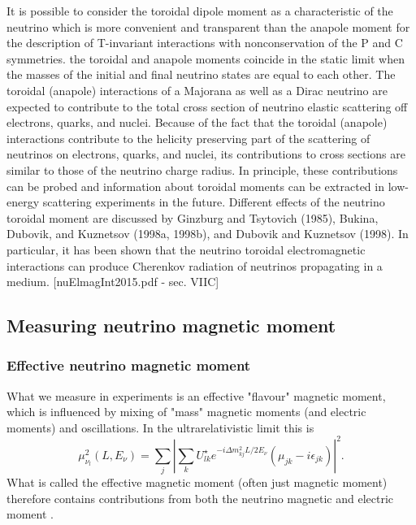 It is possible to consider  the toroidal dipole moment as a characteristic of the neutrino which is more convenient and transparent than the anapole moment for the description of T-invariant interactions with nonconservation of the P and C symmetries. the toroidal and anapole moments coincide in the static limit when the masses of the initial and final neutrino states are equal to each other. The toroidal (anapole) interactions of a Majorana as well as a Dirac neutrino are expected to contribute to the total cross section of neutrino elastic scattering off electrons, quarks, and nuclei. Because of the fact that the toroidal (anapole) interactions contribute to the helicity preserving part of the scattering of neutrinos on electrons, quarks, and nuclei, its contributions to cross sections are similar to those of the neutrino charge radius. In principle, these contributions can be probed and information about toroidal moments can be extracted in low-energy scattering experiments in the future. Different effects of the neutrino toroidal moment are discussed by Ginzburg and Tsytovich (1985), Bukina, Dubovik, and Kuznetsov (1998a, 1998b), and Dubovik and Kuznetsov (1998). In particular, it has been shown that the neutrino toroidal electromagnetic interactions can produce Cherenkov radiation of neutrinos propagating in a medium. [nuElmagInt2015.pdf - sec. VIIC]


\subsection{Measuring neutrino magnetic moment}
\subsubsection{Effective neutrino magnetic moment}
What we measure in experiments is an effective "flavour" magnetic moment, which is influenced by mixing of "mass" magnetic moments (and electric moments) and oscillations. In the ultrarelativistic limit this is
\begin{equation}
\mu_{\nu_l}^2\left(L,E_{\nu}\right)=\sum_j\left|\sum_k U^{\star}_{lk}e^{-i\Delta m^2_{kj}L/2E_{\nu}}\left(\mu_{jk}-i\epsilon_{jk}\right)\right|^2.
\end{equation}
What is called the effective magnetic moment (often just magnetic moment) therefore contains contributions from both the neutrino magnetic and electric moment \cite{nuElmagInt2015.pdf}.

